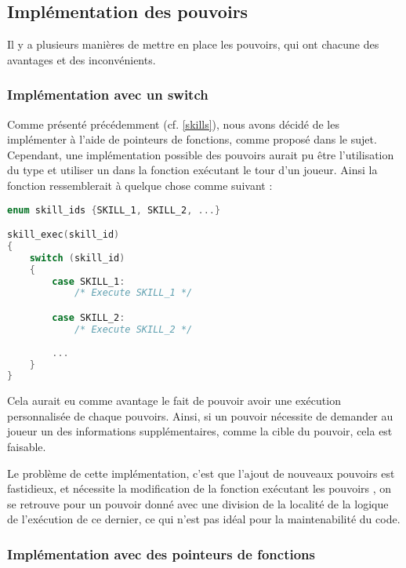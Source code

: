 
\subsection{Implémentation des pouvoirs}

Il y a plusieurs manières de mettre en place les pouvoirs, qui ont chacune des avantages et des inconvénients.

\subsubsection*{Implémentation avec un switch}

Comme présenté précédemment (cf. \ref{skills}), nous avons décidé de les implémenter à l'aide de pointeurs de fonctions, comme proposé dans le sujet. Cependant, une implémentation possible des pouvoirs aurait pu être l'utilisation du type  et utiliser un  dans la fonction exécutant le tour d'un joueur. Ainsi la fonction  ressemblerait à quelque chose comme suivant : 

\begin{lstlisting}[language=c, frame=single, caption={Pseudocode de la version possible de skill\_exec avec un switch}]
enum skill_ids {SKILL_1, SKILL_2, ...}

skill_exec(skill_id)
{
    switch (skill_id)
    {
        case SKILL_1:
            /* Execute SKILL_1 */

        case SKILL_2:
            /* Execute SKILL_2 */
            
        ...
    }
}
\end{lstlisting}

Cela aurait eu comme avantage le fait de pouvoir avoir une exécution personnalisée de chaque pouvoirs. Ainsi, si un pouvoir nécessite de demander au joueur un des informations supplémentaires, comme la cible du pouvoir, cela est faisable.

Le problème de cette implémentation, c'est que l'ajout de nouveaux pouvoirs est fastidieux, et nécessite la modification de la fonction exécutant les pouvoirs , on se retrouve pour un pouvoir donné avec une division de la localité de la logique de l'exécution de ce dernier, ce qui n'est pas idéal pour la maintenabilité du code.


\subsubsection*{Implémentation avec des pointeurs de fonctions}

